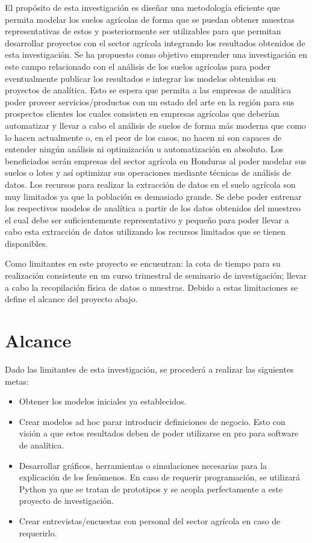 \documentclass{report}
\begin{document}
El propósito de esta investigación es diseñar una metodología eficiente que permita modelar los suelos agrícolas de forma que se puedan obtener muestras representativas de estos y posteriormente ser utilizables para que permitan desarrollar proyectos con el sector agrícola integrando los resultados obtenidos de esta investigación. Se ha propuesto como objetivo emprender una investigación en este campo relacionado con el análisis de los suelos agrícolas para poder eventualmente publicar los resultados e integrar los modelos obtenidos en proyectos de analítica. Esto se espera que permita a las empresas de analítica poder proveer servicios/productos con un estado del arte en la región para sus prospectos clientes los cuales consisten en empresas agrícolas que deberían automatizar y llevar a cabo el análisis de suelos de forma más moderna que como lo hacen actualmente o, en el peor de los casos, no hacen ni son capaces de entender ningún análisis ni optimización u automatización en absoluto. Los beneficiados serán empresas del sector agrícola en Honduras al poder modelar sus suelos o lotes y así optimizar sus operaciones mediante técnicas de análisis de datos. Los recursos para realizar la extracción de datos en el suelo agrícola son muy limitados ya que la población es demasiado grande. Se debe poder entrenar los respectivos modelos de analítica a partir de los datos obtenidos del muestreo el cual debe ser suficientemente representativo y pequeño para poder llevar a cabo esta extracción de datos utilizando los recursos limitados que se tienen disponibles.

\bigbreak

Como limitantes en este proyecto se encuentran: la cota de tiempo para su realización consistente en un curso trimestral de seminario de investigación; llevar a cabo la recopilación física de datos o muestras. Debido a estas limitaciones se define el alcance del proyecto abajo.

\section{Alcance}

Dado las limitantes de esta investigación, se procederá a realizar las siguientes metas:

\begin{itemize}
    \item Obtener los modelos iniciales ya establecidos.
    
    \item Crear modelos ad hoc parar introducir definiciones de negocio. Esto con visión a que estos resultados deben de poder utilizarse en pro para software de analítica.
    
    \item Desarrollar gráficos, herramientas o simulaciones necesarias para la explicación de los fenómenos. En caso de requerir programación, se utilizará Python ya que se tratan de prototipos y se acopla perfectamente a este proyecto de investigación.
    
    \item Crear entrevistas/encuestas con personal del sector agrícola en caso de requerirlo.
\end{itemize}
\end{document}
